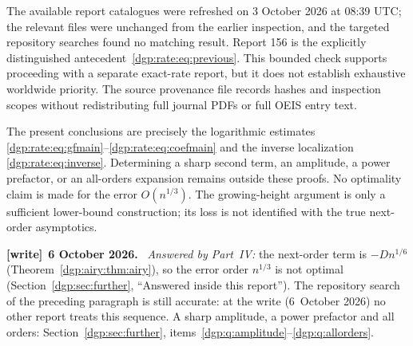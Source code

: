 \documentclass[11pt,letterpaper]{article}
\numberwithin{equation}{section}
\theoremstyle{remark}\newtheorem{remark}[theorem]{Remark}
\newenvironment{writenote}[1][]{\par\smallskip\begingroup\small
 \noindent\textbf{[write]}\if\relax\detokenize{#1}\relax\else~\textbf{#1.}\fi\ }%
 {\par\endgroup\smallskip}
\begin{document}
The available report catalogues were refreshed on 3 October 2026 at
08:39 UTC; the relevant files were unchanged from the earlier inspection,
and the targeted repository searches found no matching result.
Report 156 is the explicitly distinguished antecedent~\eqref{dgp:rate:eq:previous}.
This bounded check supports proceeding with a separate exact-rate report,
but it does not establish exhaustive worldwide priority. The source
provenance file records hashes and inspection scopes without redistributing
full journal PDFs or full OEIS entry text.

The present conclusions are precisely the logarithmic estimates
\eqref{dgp:rate:eq:gfmain}--\eqref{dgp:rate:eq:coefmain} and the inverse localization
\eqref{dgp:rate:eq:inverse}. Determining a sharp second term, an amplitude, a
power prefactor, or an all-orders expansion remains outside these proofs.
No optimality claim is made for the error $O(n^{1/3})$. The growing-height
argument is only a sufficient lower-bound construction; its loss is not
identified with the true next-order asymptotics.
\begin{writenote}[6 October 2026]
\emph{Answered by Part~IV:} the next-order term is $-Dn^{1/6}$ (Theorem~\ref{dgp:airy:thm:airy}), so the error order $n^{1/3}$ is not optimal (Section~\ref{dgp:sec:further}, ``Answered inside this report''). The repository search of the preceding paragraph is still accurate: at the write (6~October 2026) no other report treats this sequence. A sharp amplitude, a power prefactor and all orders: Section~\ref{dgp:sec:further}, items~\ref{dgp:q:amplitude}--\ref{dgp:q:allorders}.
\end{writenote}

\clearpage
\end{document}
